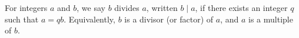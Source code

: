 For integers $a$ and $b$, we say $b$ divides $a$, written $b \mid a$, if there exists an integer $q$ such that $a = qb$. Equivalently, $b$ is a divisor (or factor) of $a$, and $a$ is a multiple of $b$.

